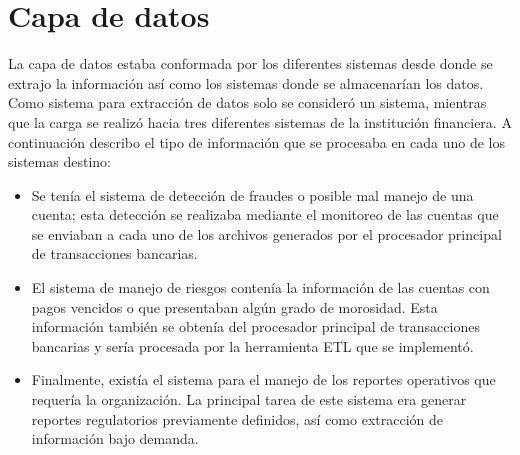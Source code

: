 \section{Capa de datos}

La capa de datos estaba conformada por los diferentes sistemas desde donde se
extrajo la información así como los sistemas donde se almacenarían los
datos. Como sistema para extracción de datos solo se consideró un sistema,
mientras que la carga se realizó hacia tres diferentes sistemas de la
institución financiera. A continuación describo el tipo de información que se
procesaba en cada uno de los sistemas destino:

\begin{itemize}

\item Se tenía el sistema de detección de fraudes o posible mal manejo de una
  cuenta; esta detección se realizaba mediante el monitoreo de las cuentas que
  se enviaban a cada uno de los archivos generados por el procesador principal
  de transacciones bancarias.

\item El sistema de manejo de riesgos contenía la información de las cuentas
  con pagos vencidos o que presentaban algún grado de morosidad. Esta
  información también se obtenía del procesador principal de transacciones
  bancarias y sería procesada por la herramienta ETL que se implementó.

\item Finalmente, existía el sistema para el manejo de los reportes operativos
  que requería la organización. La principal tarea de este sistema era generar
  reportes regulatorios previamente definidos, así como extracción de
  información bajo demanda.
\end{itemize}

\cleardoublepage

